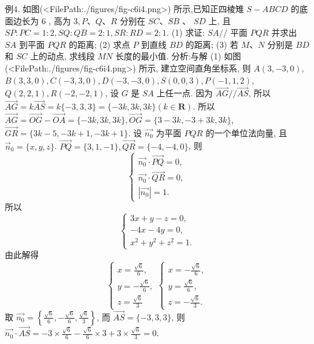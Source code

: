 例4. 如图(<FilePath:./figures/fig-c6i4.png>) 所示,已知正四棱雉 $S-A B C D$ 的底面边长为 6 , 高为 $3, P 、 Q 、 R$ 分别在 $S C 、 S B$ 、 $S D$ 上, 且 $S P: P C=1: 2, S Q: Q B=2: 1, S R: R D=2: 1$.
(1) 求证: $S A / /$ 平面 $P Q R$ 并求出 $S A$ 到平面 $P Q R$ 的距离;
(2) 求点 $P$ 到直线 $B D$ 的距离;
(3) 若 $M 、 N$ 分别是 $B D$ 和 $S C$ 上的动点, 求线段 $M N$ 长度的最小值.
分析:与解 (1) 如图(<FilePath:./figures/fig-c6i4.png>) 所示, 建立空间直角坐标系, 则 $A(3,-3,0)$, $B(3,3,0), C(-3,3,0), D(-3,-3,0), S(0,0,3), P(-1,1,2)$, $Q(2,2,1), R(-2,-2,1)$, 设 $G$ 是 $S A$ 上任一点.
因为 $\overrightarrow{A G} / / \overrightarrow{A S}$, 所以 $\overrightarrow{A G}=k \overrightarrow{A S}=k\{-3,3,3\}=\{-3 k, 3 k, 3 k\} (k \in \mathbf{R})$.
所以 $\overrightarrow{A G}=\overrightarrow{O G}-\overrightarrow{O A}=\{-3 k, 3 k, 3 k\}, \overrightarrow{O G}=\{3-3 k,-3+3 k, 3 k\}$, $\overrightarrow{G R}=\{3 k-5,-3 k+1,-3 k+1\}$.
设 $\overrightarrow{n_0}$ 为平面 $P Q R$ 的一个单位法向量, 且 $\vec{n}_0=\{x, y, z\}$.
$\overrightarrow{P Q}=\{3,1,-1\}, \overrightarrow{Q R}=\{-4,-4,0\}$, 则
$$
\left\{\begin{array}{l}
\overrightarrow{n_0} \cdot \overrightarrow{P Q}=0, \\
\overrightarrow{n_0} \cdot \overrightarrow{Q R}=0, \\
\left|\overrightarrow{n_0}\right|=1 .
\end{array}\right.
$$
所以
$$
\left\{\begin{array}{l}
3 x+y-z=0, \\
-4 x-4 y=0, \\
x^2+y^2+z^2=1 .
\end{array}\right.
$$
由此解得
$$
\left\{\begin{array} { l } 
{ x = \frac { \sqrt { 6 } } { 6 } , } \\
{ y = - \frac { \sqrt { 6 } } { 6 } , } \\
{ z = \frac { \sqrt { 6 } } { 3 } }
\end{array} \left\{\begin{array}{l}
x=-\frac{\sqrt{6}}{6}, \\
y=\frac{\sqrt{6}}{6}, \\
z=-\frac{\sqrt{6}}{3} .
\end{array}\right.\right.
$$
取 $\overrightarrow{n_0}=\left\{\frac{\sqrt{6}}{6},-\frac{\sqrt{6}}{6}, \frac{\sqrt{6}}{3}\right\}$, 而 $\overrightarrow{A S}=\{-3,3,3\}$, 则 $\overrightarrow{n_0} \cdot \overrightarrow{A S}=-3 \times \frac{\sqrt{6}}{6}- \frac{\sqrt{6}}{6} \times 3+3 \times \frac{\sqrt{6}}{3}=0$.
